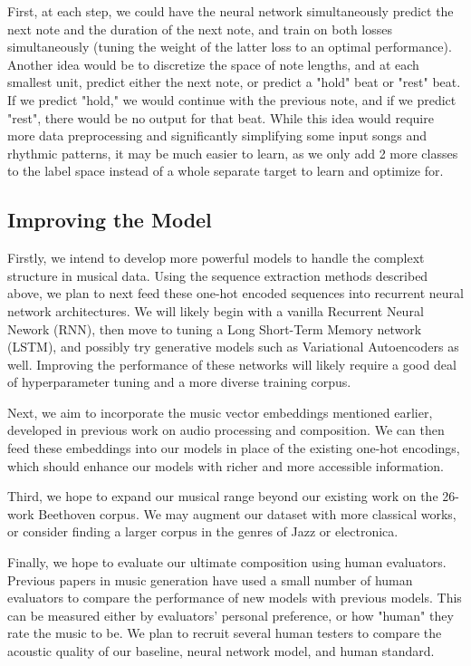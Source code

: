 \documentclass[twoside,twocolumn]{article}
\begin{document}
First, at each step, we could have the neural network simultaneously predict the next note and the duration of the next note, and train on both losses simultaneously (tuning the weight of the latter loss to an optimal performance). Another idea would be to discretize the space of note lengths, and at each smallest unit, predict either the next note, or predict a "hold" beat or "rest" beat. If we predict "hold," we would continue with the previous note, and if we predict "rest", there would be no output for that beat. While this idea would require more data preprocessing and significantly simplifying some input songs and rhythmic patterns, it may be much easier to learn, as we only add 2 more classes to the label space instead of a whole separate target to learn and optimize for.

\subsection{Improving the Model}

Firstly, we intend to develop more powerful models to handle the complext structure in musical data. Using the sequence extraction methods described above, we plan to next feed these one-hot encoded sequences into recurrent neural network architectures. We will likely begin with a vanilla Recurrent Neural Nework (RNN), then move to tuning a Long Short-Term Memory network (LSTM), and possibly try generative models such as Variational Autoencoders as well. Improving the performance of these networks will likely require a good deal of hyperparameter tuning and a more diverse training corpus.

Next, we aim to incorporate the music vector embeddings mentioned earlier, developed in previous work on audio processing and composition. We can then feed these embeddings into our models in place of the existing one-hot encodings, which should enhance our models with richer and more accessible information.

Third, we hope to expand our musical range beyond our existing work on the 26-work Beethoven corpus. We may augment our dataset with more classical works, or consider finding a larger corpus in the genres of Jazz or electronica.

Finally, we hope to evaluate our ultimate composition using human evaluators. Previous papers in music generation have used a small number of human evaluators to compare the performance of new models with previous models. This can be measured either by evaluators' personal preference, or how "human" they rate the music to be. We plan to recruit several human testers to compare the acoustic quality of our baseline, neural network model, and human standard.
\end{document}
